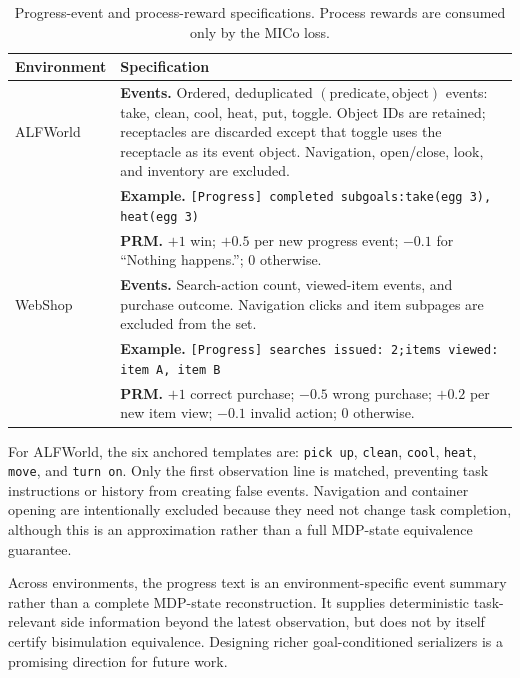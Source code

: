 \begin{table}[!b]
\centering
\caption{Progress-event and process-reward specifications. Process rewards are consumed only by the MICo loss.}
\label{tab:progress_rules}
\scriptsize
\renewcommand{\arraystretch}{1.12}
\begin{tabular}{@{}p{1.65cm}p{5.55cm}@{}}
\toprule
Environment & Specification \\
\midrule
ALFWorld & \textbf{Events.} Ordered, deduplicated $(\mathrm{predicate},\mathrm{object})$ events: take, clean, cool, heat, put, toggle. Object IDs are retained; receptacles are discarded except that toggle uses the receptacle as its event object. Navigation, open/close, look, and inventory are excluded. \\
& \textbf{Example.} \texttt{[Progress] completed subgoals:\newline take(egg 3), heat(egg 3)} \\
& \textbf{PRM.} $+1$ win; $+0.5$ per new progress event; $-0.1$ for ``Nothing happens.''; $0$ otherwise. \\
\midrule
WebShop & \textbf{Events.} Search-action count, viewed-item events, and purchase outcome. Navigation clicks and item subpages are excluded from the set. \\
& \textbf{Example.} \texttt{[Progress] searches issued: 2;\newline items viewed: item A, item B} \\
& \textbf{PRM.} $+1$ correct purchase; $-0.5$ wrong purchase; $+0.2$ per new item view; $-0.1$ invalid action; $0$ otherwise. \\
\bottomrule
\end{tabular}
\end{table}

For ALFWorld, the six anchored templates are:
\texttt{pick up}, \texttt{clean}, \texttt{cool}, \texttt{heat}, \texttt{move}, and \texttt{turn on}. Only the first observation line is matched, preventing task instructions or history from creating false events. Navigation and container opening are intentionally excluded because they need not change task completion, although this is an approximation rather than a full MDP-state equivalence guarantee.

Across environments, the progress text is an environment-specific event summary rather than a complete MDP-state reconstruction. It supplies deterministic task-relevant side information beyond the latest observation, but does not by itself certify bisimulation equivalence. Designing richer goal-conditioned serializers is a promising direction for future work.

